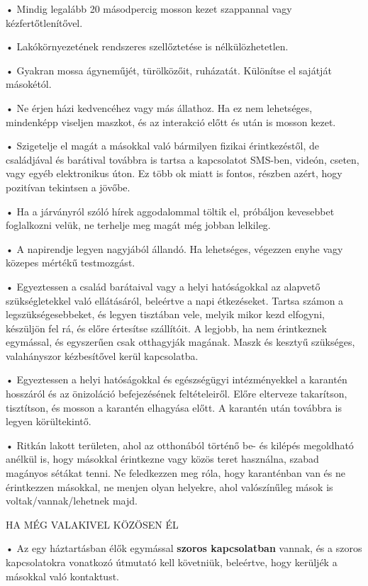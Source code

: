 \documentclass[twocolumn,journal]{IEEEtran}
\begin{document}
• Mindig legalább 20 másodpercig mosson kezet szappannal vagy kézfertőtlenítővel.

• Lakókörnyezetének rendszeres szellőztetése is nélkülözhetetlen.

• Gyakran mossa ágyneműjét, türölközőit, ruházatát. Különítse el sajátját másokétól.

• Ne érjen házi kedvencéhez vagy más állathoz. Ha ez nem lehetséges, mindenképp viseljen maszkot, és az interakció előtt és után is mosson kezet.

• Szigetelje el magát a másokkal való bármilyen fizikai érintkezéstől, de családjával és barátival továbbra is tartsa a kapcsolatot SMS-ben, videón, cseten, vagy egyéb elektronikus úton. Ez több ok miatt is fontos, részben azért, hogy pozitívan tekintsen a jövőbe.

• Ha a járványról szóló hírek aggodalommal töltik el, próbáljon kevesebbet foglalkozni velük, ne terhelje meg magát még jobban lelkileg.

• A napirendje legyen nagyjából állandó. Ha lehetséges, végezzen enyhe vagy közepes mértékű testmozgást.

• Egyeztessen a család barátaival vagy a helyi hatóságokkal az alapvető szükségletekkel való ellátásáról, beleértve a napi étkezéseket. Tartsa számon a legszükségesebbeket, és legyen tisztában vele, melyik mikor kezd elfogyni, készüljön fel rá, és előre értesítse szállítóit. A legjobb, ha nem érintkeznek egymással, és egyszerűen csak otthagyják magának. Maszk és kesztyű szükséges, valahányszor kézbesítővel kerül kapcsolatba.

• Egyeztessen a helyi hatóságokkal és egészségügyi intézményekkel a karantén hosszáról és az önizoláció befejezésének feltételeiről. Előre elterveze takarítson, tisztítson, és mosson a karantén elhagyása előtt. A karantén után továbbra is legyen körültekintő.

• Ritkán lakott területen, ahol az otthonából történő be- és kilépés megoldható anélkül is, hogy másokkal érintkezne vagy közös teret használna, szabad magányos sétákat tenni. Ne feledkezzen meg róla, hogy karanténban van és ne érintkezzen másokkal, ne menjen olyan helyekre, ahol valószínűleg mások is voltak/vannak/lehetnek majd.

\begin{center}
HA MÉG VALAKIVEL KÖZÖSEN ÉL
\end{center}



• Az egy háztartásban élők egymással \textbf{szoros kapcsolatban} vannak, és a szoros kapcsolatokra vonatkozó útmutató kell követniük, beleértve, hogy kerüljék a másokkal való kontaktust.
\end{document}

